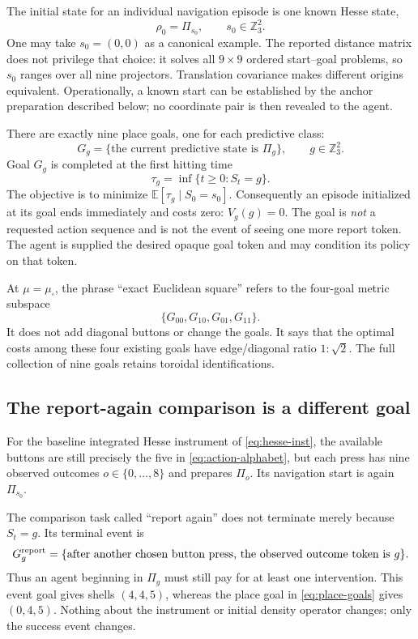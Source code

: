 \documentclass[11pt]{article}
\theoremstyle{definition}
\theoremstyle{remark}
\begin{document}
The initial state for an individual navigation episode is one known Hesse
state,
\begin{equation}
 \rho_0=\Pi_{s_0},\qquad s_0\in\mathbb Z_3^2.
 \label{eq:navigation-start}
\end{equation}
One may take \(s_0=(0,0)\) as a canonical example.  The reported distance
matrix does not privilege that choice: it solves all \(9\times9\) ordered
start--goal problems, so \(s_0\) ranges over all nine projectors.  Translation
covariance makes different origins equivalent.  Operationally, a known start
can be established by the anchor preparation described below; no coordinate
pair is then revealed to the agent.

There are exactly nine place goals, one for each predictive class:
\begin{equation}
 G_g=\{\text{the current predictive state is }\Pi_g\},
 \qquad g\in\mathbb Z_3^2.
 \label{eq:place-goals}
\end{equation}
Goal \(G_g\) is completed at the first hitting time
\[
 \tau_g=\inf\{t\geq0:S_t=g\}.
\]
The objective is to minimize \(\mathbb E[\tau_g\mid S_0=s_0]\).  Consequently
an episode initialized at its goal ends immediately and costs zero:
\(V_g(g)=0\).  The goal is \emph{not} a requested action sequence and is not
the event of seeing one more report token.  The agent is supplied the desired
opaque goal token and may condition its policy on that token.

At \(\mu=\mu_\square\), the phrase ``exact Euclidean square'' refers to the
four-goal metric subspace
\[
 \{G_{00},G_{10},G_{01},G_{11}\}.
\]
It does not add diagonal buttons or change the goals.  It says that the
optimal costs among these four existing goals have edge/diagonal ratio
\(1:\sqrt2\).  The full collection of nine goals retains toroidal
identifications.

\subsection{The report-again comparison is a different goal}

For the baseline integrated Hesse instrument of \cref{eq:hesse-inst}, the
available buttons are still precisely the five in
\cref{eq:action-alphabet}, but each press has nine observed outcomes
\(o\in\{0,\ldots,8\}\) and prepares \(\Pi_o\).  Its navigation start is again
\(\Pi_{s_0}\).

The comparison task called ``report again'' does not terminate merely because
\(S_t=g\).  Its terminal event is
\begin{equation}
 G_g^{\rm report}=\{\text{after another chosen button press, the observed
 outcome token is }g\}.
 \label{eq:report-goal}
\end{equation}
Thus an agent beginning in \(\Pi_g\) must still pay for at least one
intervention.  This event goal gives shells \((4,4,5)\), whereas the place goal
in \cref{eq:place-goals} gives \((0,4,5)\).  Nothing about the instrument or
initial density operator changes; only the success event changes.
\end{document}
